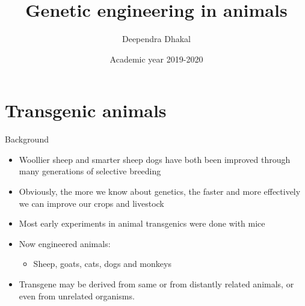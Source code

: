 \documentclass[ignorenonframetext,aspectratio=169]{beamer}
\title{Genetic engineering in animals}
\author{Deependra Dhakal}
\institute{GAASC, Baitadi \and Tribhuwan University}
\date{Academic year 2019-2020}
\providecommand{\tightlist}{%
  \setlength{\itemsep}{0pt}\setlength{\parskip}{0pt}}
\begin{document}
\frame{\titlepage}

\begin{frame}
\tableofcontents[hideallsubsections]
\end{frame}
\hypertarget{transgenic-animals}{%
\section{Transgenic animals}\label{transgenic-animals}}

\begin{frame}{Background}
\protect\hypertarget{background}{}

\begin{itemize}
\tightlist
\item
  Woollier sheep and smarter sheep dogs have both been improved through
  many generations of selective breeding
\item
  Obviously, the more we know about genetics, the faster and more
  effectively we can improve our crops and livestock
\item
  Most early experiments in animal transgenics were done with mice
\item
  Now engineered animals:

  \begin{itemize}
  \tightlist
  \item
    Sheep, goats, cats, dogs and monkeys
  \end{itemize}
\item
  Transgene may be derived from same or from distantly related animals,
  or even from unrelated organisms.
\end{itemize}

\end{frame}
\end{document}
